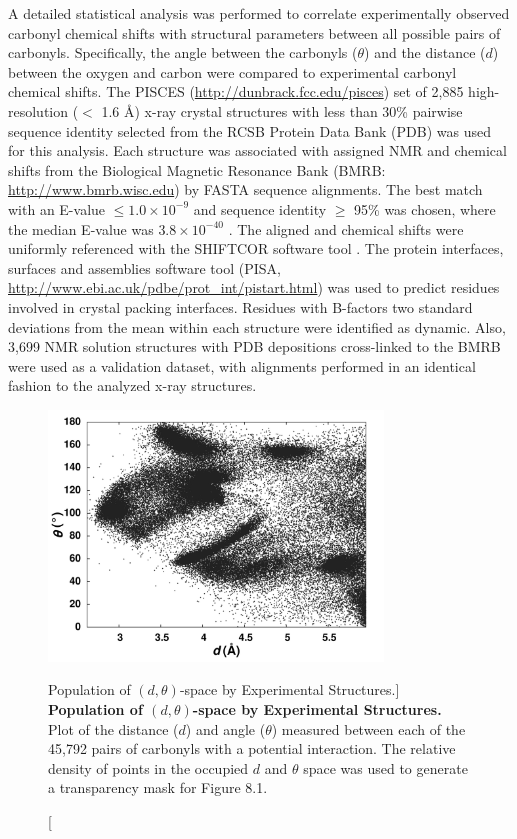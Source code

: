 \begin{doublespace}
A detailed statistical analysis was performed to correlate experimentally
observed carbonyl \cnmr{} chemical shifts with structural parameters between
all possible pairs of carbonyls. Specifically, the angle between the carbonyls
($\theta$) and the distance ($d$) between the oxygen and carbon were compared
to experimental carbonyl \cnmr{} chemical shifts. The PISCES
\cite{wang:binf2003} (\url{http://dunbrack.fcc.edu/pisces}) set of
2,885 high-resolution ($<$ 1.6 \r{A}) x-ray crystal structures with less than
30\% pairwise sequence identity selected from the RCSB Protein Data Bank
(PDB) \cite{berman:nar2000} was used for this analysis. Each structure
was associated with assigned NMR \cnmr{} and \nnmr{} chemical shifts from the
Biological Magnetic Resonance Bank (BMRB: \url{http://www.bmrb.wisc.edu})
\cite{ulrich:nar2008} by FASTA \cite{pearson:mmbio2000}
sequence alignments. The best match with an E-value $\leq 1.0\times10^{-9}$
and sequence identity $\geq$ 95\% was chosen, where the median E-value was
$3.8\times10^{-40}$ . The aligned \cnmr{} and \nnmr{} chemical shifts were
uniformly referenced with the SHIFTCOR software tool
\cite{wishart:jbnmr2003}. The protein interfaces,
surfaces and assemblies software tool
(PISA, \url{http://www.ebi.ac.uk/pdbe/prot_int/pistart.html})
\cite{krissinel:acryst2004} was used to predict residues involved
in crystal packing interfaces. Residues with B-factors two standard deviations
from the mean within each structure were identified as dynamic. Also, 3,699 NMR
solution structures with PDB depositions cross-linked to the BMRB were
used as a validation dataset, with alignments performed in an identical
fashion to the analyzed x-ray structures.
\end{doublespace}

\begin{figure}
\includegraphics[width=3.5in]{figs/npistar/02.png}
\caption
      [Population of $(d,\theta)$-space by Experimental Structures.]{
  {\bf Population of $(d,\theta)$-space by Experimental Structures.}
  \\
  Plot of the distance ($d$) and angle ($\theta$) measured between each of
  the 45,792 pairs of carbonyls with a potential \npistar{} interaction. The
  relative density of points in the occupied $d$ and $\theta$ space was used
  to generate a transparency mask for Figure 8.1.
}
\end{figure}

